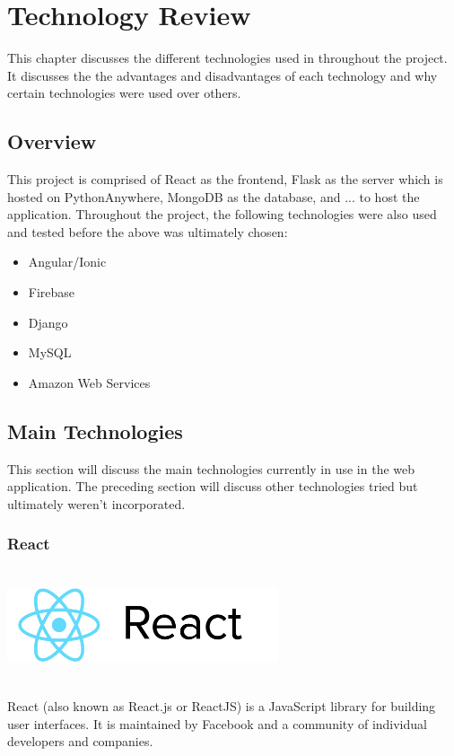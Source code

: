 \chapter{Technology Review}
This chapter discusses the different technologies used in throughout the project. It discusses the the advantages and disadvantages of each technology and why certain technologies were used over others.

\section{Overview}
This project is comprised of React as the frontend, Flask as the server which is hosted on PythonAnywhere, MongoDB as the database, and ... to host the application. Throughout the project, the following technologies were also used and tested before the above was ultimately chosen:
\begin{itemize}
    \item Angular/Ionic
    \item Firebase
    \item Django
    \item MySQL
    \item Amazon Web Services
\end{itemize}

\section{Main Technologies}
This section will discuss the main technologies currently in use in the web application. The preceding section will discuss other technologies tried but ultimately weren't incorporated. 

\newpage

\subsection{React}
\par
\medskip
\begin{center}
    \includegraphics[width=8cm,height=3.3cm,keepaspectratio]{images/react}
\end{center}
React (also known as React.js or ReactJS) is a JavaScript library for building user interfaces. It is maintained by Facebook and a community of individual developers and companies.

